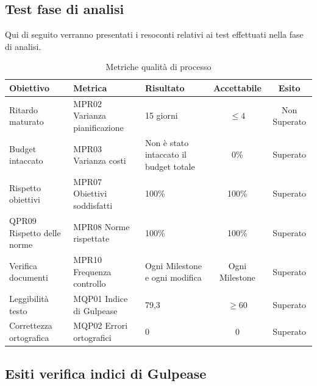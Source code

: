\documentclass[../piano_di_qualifica.tex]{subfiles}
\begin{document}
\subsection{Test fase di analisi}
Qui di seguito verranno presentati i resoconti relativi ai test effettuati nella fase di analisi. \par

\begin{table}[!ht]
	\centering
	\begin{tabular}{|p{3cm}|p{3.3cm}|l|c|c|}
		\hline
		\rowcolor{lightgray}
		\textbf{Obiettivo}  & \textbf{Metrica} & \textbf{Risultato} & \textbf{Accettabile} & \textbf{Esito} \\
		\hline
		Ritardo maturato & MPR02 Varianza pianificazione  & 15 giorni  & \(\leq 4\) & Non Superato  \\
		\hline
		Budget intaccato   & MPR03 Varianza costi   &  Non è stato intaccato il budget totale    &  0\%  &  Superato\\
		\hline
		Rispetto obiettivi   & MPR07 Obiettivi soddisfatti     & 100\%   & 100\% & Superato  \\
		\hline
		QPR09 Rispetto delle norme  & MPR08 Norme rispettate   & 100\%  & 100\%   & Superato\\
		\hline
		Verifica documenti   & MPR10 Frequenza controllo    & Ogni Milestone e ogni modifica   & Ogni Milestone    & Superato \\
		\hline
		Leggibilità testo & MQP01 Indice di Gulpease  & 79,3  & \(\ge 60\)  & Superato \\
		\hline
		Correttezza ortografica   & MQP02 Errori ortografici   &     0    &  0 & Superato  \\
		\hline
	\end{tabular}
	\caption{Metriche qualità di processo}
\end{table}


\subsection{Esiti verifica indici di Gulpease}
\label{sub:verif_gul}
\end{document}
